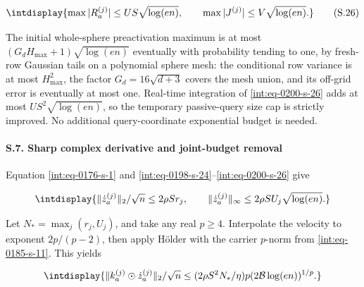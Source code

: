 \begingroup\renewcommand{\theHequation}{intdisplay.408}
\begin{equation}
\intdisplay{
\max|R_a^{(j)}|\le US\sqrt{\log(en)},\qquad
\max|J^{(j)}|\le V\sqrt{\log(en)}.
}
\tag{S.26}
\label{int:eq-0200-s-26}
\end{equation}
\endgroup


The initial whole-sphere preactivation maximum is at most \((G_dH_{\max}+1)\sqrt{\log(en)}\) eventually with probability tending to one, by fresh-row Gaussian tails on a polynomial sphere mesh: the conditional row variance is at most \(H_{\max}^2\), the factor \(G_d=16\sqrt{d+3}\) covers the mesh union, and its off-grid error is eventually at most one. Real-time integration of \eqref{int:eq-0200-s-26} adds at most \(US^2\sqrt{\log(en)}\), so the temporary passive-query size cap is strictly improved. No additional query-coordinate exponential budget is needed.


\paragraph{S.7. Sharp complex derivative and joint-budget removal}

\mbox{}\par\smallskip


Equation \eqref{int:eq-0176-s-1} and \eqref{int:eq-0198-s-24}--\allowbreak \eqref{int:eq-0200-s-26} give


\begingroup\renewcommand{\theHequation}{intdisplay.409}
\begin{equation*}
\intdisplay{
\|\dot z_a^{(j)}\|_2/\sqrt n\le2\rho Sr_j,\qquad
\|\dot z_a^{(j)}\|_\infty\le2\rho SU_j\sqrt{\log(en)}.
}
\end{equation*}
\endgroup


Let \(N_* =\max_j(r_j,\allowbreak U_j)\), and take any real \(p\ge4\). Interpolate the velocity to exponent \(2p/(p-2)\), then apply Hölder with the carrier \(p\)-norm from \eqref{int:eq-0185-s-11}. This yields


\begingroup\renewcommand{\theHequation}{intdisplay.410}
\begin{equation*}
\intdisplay{
\|k_a^{(j)}\odot\dot z_a^{(j)}\|_2/\sqrt n
\le (2\rho S^2N_*/\eta)p(2\mathcal B\log(en))^{1/p}.
}
\end{equation*}
\endgroup


